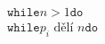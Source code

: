 \documentclass[preview]{standalone}
\begin{document}
\begin{align*}
\mathtt{while}  n > 1  \mathtt{do} \\ \mathtt{while}  p_i \text{ dělí } n  \mathtt{do}
\end{align*}
\end{document}
